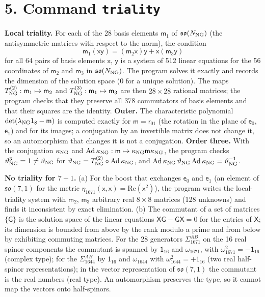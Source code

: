 \documentclass[
  10pt,
]{article}
\begin{document}
\hypertarget{command-triality}{%
\section{\texorpdfstring{5. Command
\texttt{triality}}{5. Command triality}}\label{command-triality}}

\textbf{Local triality.} For each of the 28 basis elements
\(\mathsf m_1\) of \(\mathfrak{so}(N_{\rm NG})\) (the antisymmetric
matrices with respect to the norm), the condition
\[\mathsf m_1(\mathsf x\mathsf y)=(\mathsf m_2\mathsf x)\mathsf y+\mathsf x(\mathsf m_3\mathsf y)\]
for all 64 pairs of basis elements \(\mathsf x\), \(\mathsf y\) is a
system of 512 linear equations for the 56 coordinates of \(\mathsf m_2\)
and \(\mathsf m_3\) in \(\mathfrak{so}(N_{\rm NG})\). The program solves
it exactly and records the dimension of the solution space (0 for a
unique solution). The maps
\(T^{(2)}_{\rm NG}:\mathsf m_1\mapsto\mathsf m_2\) and
\(T^{(3)}_{\rm NG}:\mathsf m_1\mapsto\mathsf m_3\) are then
\(28\times28\) rational matrices; the program checks that they preserve
all 378 commutators of basis elements and that their squares are the
identity. \textbf{Outer.} The characteristic polynomial
\(\det(\lambda_{\rm NG}\mathsf 1_8-\mathsf m)\) is computed exactly for
\(\mathsf m=\mathsf r_{01}\) (the rotation in the plane of
\(\mathsf e_0\), \(\mathsf e_1\)) and for its images; a conjugation by
an invertible matrix does not change it, so an automorphism that changes
it is not a conjugation. \textbf{Order three.} With the conjugation
\(\kappa_{\rm NG}\) and
\(\mathrm{Ad}\,\kappa_{\rm NG}:\mathsf m\mapsto\kappa_{\rm NG}\mathsf m\kappa_{\rm NG}\),
the program checks \(\vartheta_{\rm NG}^3=1\ne\vartheta_{\rm NG}\) for
\(\vartheta_{\rm NG}=T^{(2)}_{\rm NG}\circ\mathrm{Ad}\,\kappa_{\rm NG}\),
and
\(\mathrm{Ad}\,\kappa_{\rm NG}\,\vartheta_{\rm NG}\,\mathrm{Ad}\,\kappa_{\rm NG}=\vartheta_{\rm NG}^{-1}\).

\textbf{No triality for \(7+1\).} (a) For the boost that exchanges
\(\mathsf e_0\) and \(\mathsf e_1\) (an element of
\(\mathfrak{so}(7,1)\) for the metric
\(\eta_{1671}(\mathsf x,\mathsf x)=\mathrm{Re}(\mathsf x^2)\)), the
program writes the local-triality system with \(\mathsf m_2\),
\(\mathsf m_3\) arbitrary real \(8\times8\) matrices (128 unknowns) and
finds it inconsistent by exact elimination. (b) The commutant of a set
of matrices \(\{\mathsf G\}\) is the solution space of the linear
equations \(\mathsf X\mathsf G-\mathsf G\mathsf X=0\) for the entries of
\(\mathsf X\); its dimension is bounded from above by the rank modulo a
prime and from below by exhibiting commuting matrices. For the 28
generators \(\Sigma^{AB}_{1671}\) on the 16 real spinor components the
commutant is spanned by \(\mathsf 1_{16}\) and \(\omega_{1671}\), with
\(\omega_{1671}^2=-\mathsf 1_{16}\) (complex type); for the
\(\Sigma^{AB}_{1644}\) by \(\mathsf 1_{16}\) and \(\omega_{1644}\) with
\(\omega_{1644}^2=+\mathsf 1_{16}\) (two real half-spinor
representations); in the vector representation of \(\mathfrak{so}(7,1)\)
the commutant is the real numbers (real type). An automorphism preserves
the type, so it cannot map the vectors onto half-spinors.
\end{document}
